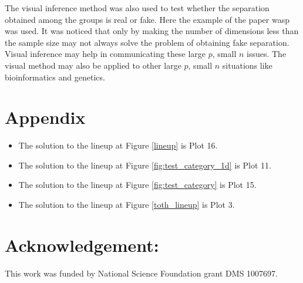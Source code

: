 The visual inference method was also used to test whether the separation obtained among the groups is real or fake. Here the example of the paper wasp was used. It was noticed that only by making the number of dimensions less than the sample size may not always solve the problem of obtaining fake separation. Visual inference may help in communicating these large $p$, small $n$ issues. The visual method may also be applied to other large $p$, small $n$ situations like bioinformatics and genetics.

\section{Appendix}

\begin{itemize}
\item The solution to the lineup at Figure \ref{lineup} is Plot 16. 
\item The solution to the lineup at Figure \ref{fig:test_category_1d} is Plot 11.
\item The solution to the lineup at Figure \ref{fig:test_category} is Plot 15.
\item The solution to the lineup at Figure \ref{toth_lineup} is Plot 3.


\end{itemize}



\section{Acknowledgement:}
%
This work was funded by National Science Foundation grant DMS 1007697.

%




